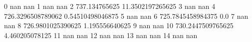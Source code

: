 0 nan nan
1 nan nan
2 737.134765625 11.3502197265625
3 nan nan
4 726.3296508789062 0.54510498046875
5 nan nan
6 725.7845458984375 0.0
7 nan nan
8 726.9801025390625 1.195556640625
9 nan nan
10 730.2447509765625 4.460205078125
11 nan nan
12 nan nan
13 nan nan
14 nan nan
